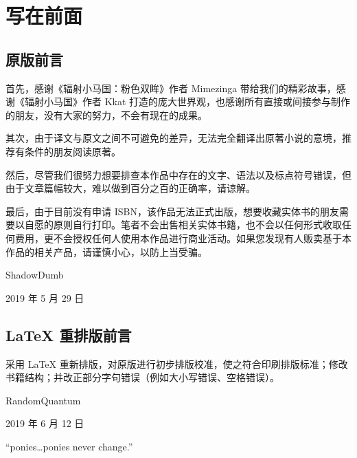 \chapter{写在前面}

\section*{原版前言}

首先，感谢《辐射小马国：粉色双眸》作者 Mimezinga 带给我们的精彩故事，感谢《辐射小马国》作者 Kkat 打造的庞大世界观，也感谢所有直接或间接参与制作的朋友，没有大家的努力，不会有现在的成果。

其次，由于译文与原文之间不可避免的差异，无法完全翻译出原著小说的意境，推荐有条件的朋友阅读原著。

然后，尽管我们很努力想要排查本作品中存在的文字、语法以及标点符号错误，但由于文章篇幅较大，难以做到百分之百的正确率，请谅解。

最后，由于目前没有申请 ISBN，该作品无法正式出版，想要收藏实体书的朋友需要以自愿的原则自行打印。笔者不会出售相关实体书籍，也不会以任何形式收取任何费用，更不会授权任何人使用本作品进行商业活动。如果您发现有人贩卖基于本作品的相关产品，请谨慎小心，以防上当受骗。

\begin{flushright}
ShadowDumb

2019 年 5 月 29 日
\end{flushright}


\section*{\LaTeX{} 重排版前言}

采用 \LaTeX{} 重新排版，对原版进行初步排版校准，使之符合印刷排版标准；修改书籍结构；并改正部分字句错误（例如大小写错误、空格错误）。

\begin{flushright}
RandomQuantum

2019 年 6 月 12 日
\end{flushright}

\clearpage

\begin{motto}
``ponies\dots ponies never change.''
\end{motto}

